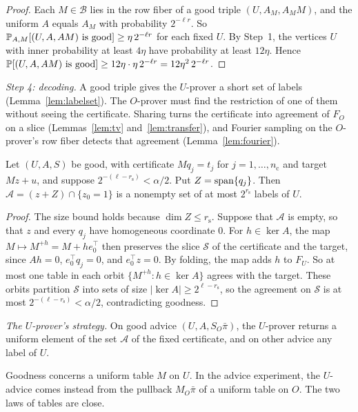 \begin{proof}
Each $M\in\mathcal B$ lies in the row fiber of a good triple $(U,A_M,A_MM)$, and the uniform $A$ equals $A_M$ with probability $2^{-\ell r}$. So $\mathbb{P}_{A,M}[(U,A,AM)\text{ is good}]\ge\eta\,2^{-\ell r}$ for each fixed $U$. By Step~1, the vertices $U$ with inner probability at least $4\eta$ have probability at least $12\eta$. Hence $\mathbb{P}[(U,A,AM)\text{ is good}]\ge12\eta\cdot\eta\,2^{-\ell r}=12\eta^2\,2^{-\ell r}$.
\end{proof}

\emph{Step 4: decoding.} A good triple gives the $U$-prover a short set of labels (Lemma~\ref{lem:labelset}). The $O$-prover must find the restriction of one of them without seeing the certificate. Sharing turns the certificate into agreement of $F_O$ on a slice (Lemmas~\ref{lem:tv} and~\ref{lem:transfer}), and Fourier sampling on the $O$-prover's row fiber detects that agreement (Lemma~\ref{lem:fourier}).

\begin{lemma}\label{lem:labelset}
Let $(U,A,S)$ be good, with certificate $Mq_j=t_j$ for $j=1,\dots,n_{\mathrm c}$ and target $Mz+u$, and suppose $2^{-(\ell-r_{\mathrm s})}<\alpha/2$. Put $Z=\operatorname{span}\{q_j\}$. Then $\mathcal A=(z+Z)\cap\{z_0=1\}$ is a nonempty set of at most $2^{r_{\mathrm s}}$ labels of $U$.
\end{lemma}

\begin{proof}
The size bound holds because $\dim Z\le r_{\mathrm s}$. Suppose that $\mathcal A$ is empty, so that $z$ and every $q_j$ have homogeneous coordinate $0$. For $h\in\ker A$, the map $M\mapsto M^{+h}=M+he_0^\top$ then preserves the slice $\mathcal S$ of the certificate and the target, since $Ah=0$, $e_0^\top q_j=0$, and $e_0^\top z=0$. By folding, the map adds $h$ to $F_U$. So at most one table in each orbit $\{M^{+h}:h\in\ker A\}$ agrees with the target. These orbits partition $\mathcal S$ into sets of size $|\ker A|\ge2^{\ell-r_{\mathrm s}}$, so the agreement on $\mathcal S$ is at most $2^{-(\ell-r_{\mathrm s})}<\alpha/2$, contradicting goodness.
\end{proof}

\emph{The $U$-prover's strategy.} On good advice $(U,A,S_O\bar\pi)$, the $U$-prover returns a uniform element of the set $\mathcal A$ of the fixed certificate, and on other advice any label of $U$.

Goodness concerns a uniform table $M$ on $U$. In the advice experiment, the $U$-advice comes instead from the pullback $M_O\bar\pi$ of a uniform table on $O$. The two laws of tables are close.

